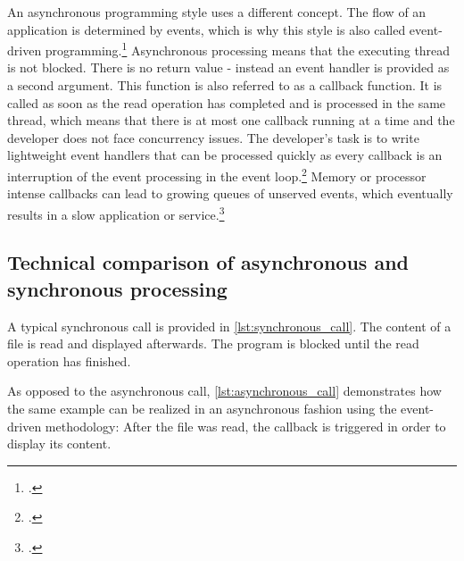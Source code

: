 An asynchronous programming style uses a different concept. The flow of an
application is determined by events, which is why this style is also called
event-driven programming.\footcite[Cf.][16]{teixeira_2012} Asynchronous processing means
that the executing thread is not blocked. There is no
return value - instead an event handler is provided as a second argument.
This function is also referred to as a callback function. It is called as soon
as the read operation has completed and is processed in the same thread, which
means that there is at most one callback running at a time and the developer
does not face concurrency issues.
The developer’s task is to write lightweight event handlers that can be
processed quickly as every callback is an interruption of the event processing
in the event loop.\footcite[Cf.][]{Croucher_2012} Memory or processor intense
callbacks can lead to growing queues of unserved events, which eventually
results in a slow application or service.\footcite[Cf.][48]{teixeira_2012}


\subsection{Technical comparison of asynchronous and synchronous processing}
\label{comparison_syncasync}


A typical synchronous call is provided in \autoref{lst:synchronous_call}. The
content of a file is read and displayed afterwards. The program is blocked until the
read operation has finished.



As opposed to the asynchronous call, \autoref{lst:asynchronous_call} demonstrates
how the same example can be realized in an asynchronous fashion using the event-driven
methodology: After the file was read, the callback is triggered in order to
display its content.







